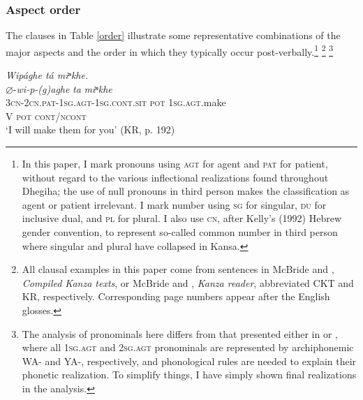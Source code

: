 \documentclass[output=paper]{LSP/langsci}
\begin{document}
\subsubsection{Aspect order} 

The clauses in Table \ref{order} illustrate some representative combinations of the major aspects and the order in which they typically occur post-verbally.\footnote{In this paper, I mark pronouns using \textsc{agt} for agent and \textsc{pat} for patient, without regard to the various inflectional
realizations found throughout Dhegiha; the use of null pronouns in third person makes the classification as agent or patient irrelevant. I mark number using \textsc{sg} for singular, \textsc{du} for inclusive dual, and \textsc{pl} for plural. I also use \textsc{cn}, after Kelly's (1992) Hebrew gender convention, to represent so-called common number in third person where singular and plural have collapsed in Kansa.} \footnote{All clausal examples in this paper come from sentences in McBride and \citet{Cumberland2009}, \textit{Compiled Kanza texts}, or McBride and \citet{Cumberland2010}, \textit{Kanza reader}, abbreviated CKT and KR, respectively. Corresponding page numbers appear after the English glosses.} \footnote{The analysis of pronominals here differs from that presented either in \citet{Quintero2004} or \citet{Rankin2005}, where all \textsc{1sg.agt} and \textsc{2sg.agt} pronominals are represented by archiphonemic WA- and YA-, respectively, and phonological rules are needed to explain their phonetic realization. To simplify things, I have simply shown final realizations in the analysis.}

\ea
{\itshape Wip\'aghe t\'a miⁿkhe.}\\ 
\glll 
$\varnothing$-\textit{wi-p-(g)aghe}  \textit{ta}  \textit{miⁿkhe} \\
 \textsc{3cn-2cn.pat-1sg.agt-1sg.cont.sit}   \textsc{pot}   \textsc{1sg.agt}.make \\
V \textsc{pot}   \textsc{cont/ncont} \\
\glt  `I will make them for you' (KR, p. 192) \\
\z

\end{document}
